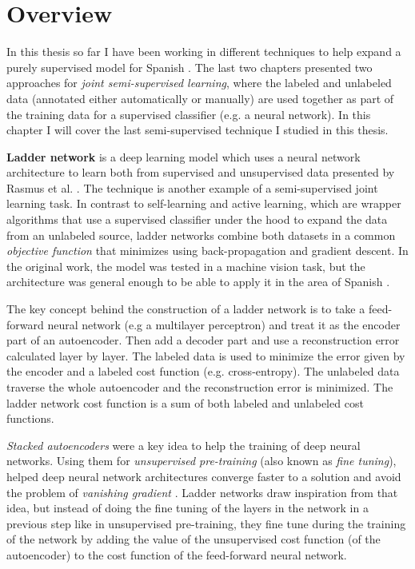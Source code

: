 \section{Overview}

In this thesis so far I have been working in different techniques to help
expand a purely supervised model for Spanish \vsd. The last two chapters
presented two approaches for {\em joint semi-supervised learning}, where the
labeled and unlabeled data (annotated either automatically or manually) are
used together as part of the training data for a supervised classifier (e.g. a
neural network). In this chapter I will cover the last semi-supervised
technique I studied in this thesis.

{\bf Ladder network} is a deep learning model which uses a neural network
architecture to learn both from supervised and unsupervised data presented by
Rasmus et al. \cite{Rasmus:2015aa}. The technique is another example of a
semi-supervised joint learning task. In contrast to self-learning and active
learning, which are wrapper algorithms that use a supervised classifier under
the hood to expand the data from an unlabeled source, ladder networks combine
both datasets in a common {\em objective function} that minimizes using
back-propagation and gradient descent. In the original work, the model was
tested in a machine vision task, but the architecture was general enough to be
able to apply it in the area of Spanish \vsd. 

The key concept behind the construction of a ladder network is to take a
feed-forward neural network (e.g a multilayer perceptron) and treat it as the
encoder part of an autoencoder. Then add a decoder part and use a
reconstruction error calculated layer by layer. The labeled data is used to
minimize the error given by the encoder and a labeled cost function (e.g.
cross-entropy). The unlabeled data traverse the whole autoencoder and the
reconstruction error is minimized. The ladder network cost function is a sum of
both labeled and unlabeled cost functions.

{\em Stacked autoencoders} \cite{Vincent:2010:SDA:1756006.1953039} were a key
idea to help the training of deep neural networks. Using them for {\em
unsupervised pre-training} (also known as {\em fine tuning}), helped deep
neural network architectures converge faster to a solution and avoid the
problem of {\em vanishing gradient} \cite{279181}. Ladder networks draw
inspiration from that idea, but instead of doing the fine tuning of the layers
in the network in a previous step like in unsupervised pre-training, they fine
tune during the training of the network by adding the value of the unsupervised
cost function (of the autoencoder) to the cost function of the feed-forward
neural network. 

